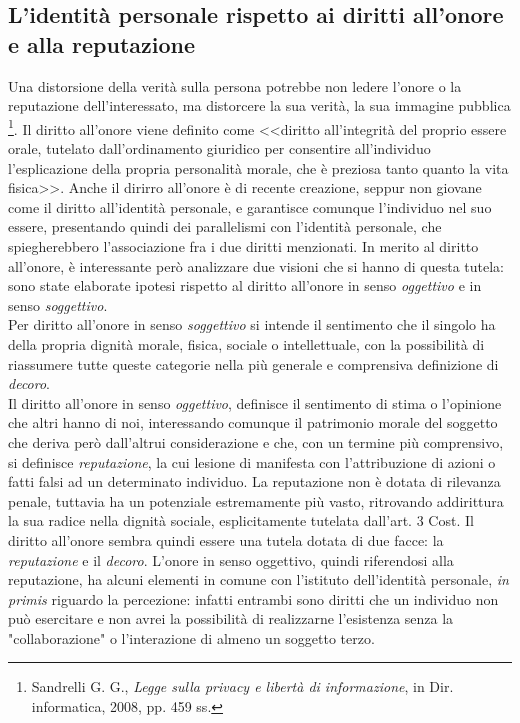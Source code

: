 \subsection{L'identità personale rispetto ai diritti all'onore e alla reputazione} %
Una distorsione della verità sulla persona potrebbe non ledere l’onore o la reputazione dell’interessato, ma distorcere la sua verità, la sua immagine pubblica \footnote{Sandrelli G. G., \textit{Legge sulla privacy e libertà di informazione}, in Dir. informatica, 2008, pp. 459 ss.}.
Il diritto all'onore viene definito come <<diritto all'integrità del proprio essere orale, tutelato dall'ordinamento giuridico per consentire all'individuo l'esplicazione della propria personalità morale, che è preziosa tanto quanto la vita fisica>>.
Anche il dirirro all'onore è di recente creazione, seppur non giovane come il diritto all'identità personale, e garantisce comunque l'individuo nel suo essere, presentando quindi dei parallelismi con l'identità personale, che spiegherebbero l'associazione fra i due diritti menzionati. In merito al diritto all'onore, è interessante però analizzare due visioni che si hanno di questa tutela: sono state elaborate ipotesi rispetto al diritto all'onore in senso \textit{oggettivo} e in senso \textit{soggettivo}.
\\Per diritto all'onore in senso \textit{soggettivo} si intende il sentimento che il singolo ha della propria dignità morale, fisica, sociale o intellettuale, con la possibilità di riassumere tutte queste categorie nella più generale e comprensiva definizione di \textit{decoro}.
\\Il diritto all'onore in senso \textit{oggettivo}, definisce il sentimento di stima o l'opinione che altri hanno di noi, interessando comunque il patrimonio morale del soggetto che deriva però dall'altrui considerazione e che, con un termine più comprensivo, si definisce \textit{reputazione}, la cui lesione di manifesta con l'attribuzione di azioni o fatti falsi ad un determinato individuo.
La reputazione non è dotata di rilevanza penale, tuttavia ha un potenziale estremamente più vasto, ritrovando addirittura la sua radice nella dignità sociale, esplicitamente tutelata dall'art. 3 Cost.
Il diritto all'onore sembra quindi essere una tutela dotata di due facce: la \textit{reputazione} e il \textit{decoro}.
L'onore in senso  oggettivo, quindi riferendosi alla reputazione, ha alcuni elementi in comune con l'istituto dell'identità personale, \textit{in primis} riguardo la percezione: infatti entrambi sono diritti che un individuo non può esercitare e non avrei la possibilità di realizzarne l'esistenza senza la "collaborazione" o l'interazione di almeno un soggetto terzo.
